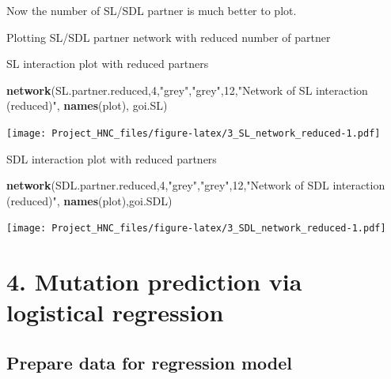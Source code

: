 \documentclass[]{article}
\newenvironment{Shaded}{\begin{snugshade}}{\end{snugshade}}
\newcommand{\KeywordTok}[1]{\textcolor[rgb]{0.13,0.29,0.53}{\textbf{#1}}}
\newcommand{\DecValTok}[1]{\textcolor[rgb]{0.00,0.00,0.81}{#1}}
\newcommand{\StringTok}[1]{\textcolor[rgb]{0.31,0.60,0.02}{#1}}
\newcommand{\NormalTok}[1]{#1}
\begin{document}
Now the number of SL/SDL partner is much better to plot.

Plotting SL/SDL partner network with reduced number of partner

SL interaction plot with reduced partners

\begin{Shaded}
\begin{Highlighting}[]
\KeywordTok{network}\NormalTok{(SL.partner.reduced,}\DecValTok{4}\NormalTok{,}\StringTok{"grey"}\NormalTok{,}\StringTok{"grey"}\NormalTok{,}\DecValTok{12}\NormalTok{,}\StringTok{"Network of SL interaction (reduced)"}\NormalTok{, }\KeywordTok{names}\NormalTok{(plot), goi.SL)}
\end{Highlighting}
\end{Shaded}

\texttt{[image: Project\_HNC\_files/figure-latex/3\_SL\_network\_reduced-1.pdf]}

SDL interaction plot with reduced partners

\begin{Shaded}
\begin{Highlighting}[]
\KeywordTok{network}\NormalTok{(SDL.partner.reduced,}\DecValTok{4}\NormalTok{,}\StringTok{"grey"}\NormalTok{,}\StringTok{"grey"}\NormalTok{,}\DecValTok{12}\NormalTok{,}\StringTok{"Network of SDL interaction (reduced)"}\NormalTok{, }\KeywordTok{names}\NormalTok{(plot),goi.SDL)}
\end{Highlighting}
\end{Shaded}

\texttt{[image: Project\_HNC\_files/figure-latex/3\_SDL\_network\_reduced-1.pdf]}

\section{4. Mutation prediction via logistical
regression}\label{mutation-prediction-via-logistical-regression}

\subsection{Prepare data for regression
model}\label{prepare-data-for-regression-model}
\end{document}
